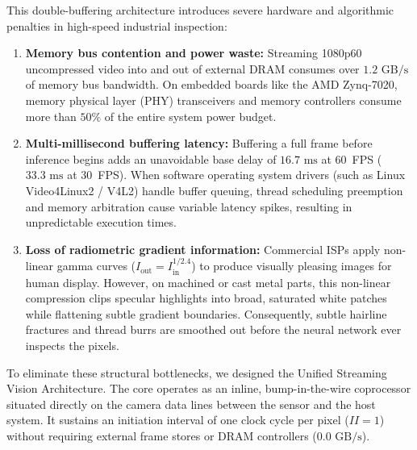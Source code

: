 \documentclass[conference]{IEEEtran}
\begin{document}
This double-buffering architecture introduces severe hardware and algorithmic penalties in high-speed industrial inspection:
\begin{enumerate}
    \item \textbf{Memory bus contention and power waste:} Streaming 1080p60 uncompressed video into and out of external DRAM consumes over $1.2\text{ GB/s}$ of memory bus bandwidth. On embedded boards like the AMD Zynq-7020, memory physical layer (PHY) transceivers and memory controllers consume more than $50\%$ of the entire system power budget.
    \item \textbf{Multi-millisecond buffering latency:} Buffering a full frame before inference begins adds an unavoidable base delay of $16.7\text{ ms}$ at 60~FPS ($33.3\text{ ms}$ at 30~FPS). When software operating system drivers (such as Linux Video4Linux2 / V4L2) handle buffer queuing, thread scheduling preemption and memory arbitration cause variable latency spikes, resulting in unpredictable execution times.
    \item \textbf{Loss of radiometric gradient information:} Commercial ISPs apply non-linear gamma curves ($I_{\text{out}} = I_{\text{in}}^{1/2.4}$) to produce visually pleasing images for human display. However, on machined or cast metal parts, this non-linear compression clips specular highlights into broad, saturated white patches while flattening subtle gradient boundaries. Consequently, subtle hairline fractures and thread burrs are smoothed out before the neural network ever inspects the pixels.
\end{enumerate}

To eliminate these structural bottlenecks, we designed the Unified Streaming Vision Architecture. The core operates as an inline, bump-in-the-wire coprocessor situated directly on the camera data lines between the sensor and the host system. It sustains an initiation interval of one clock cycle per pixel ($II=1$) without requiring external frame stores or DRAM controllers ($0.0\text{ GB/s}$).
\end{document}
